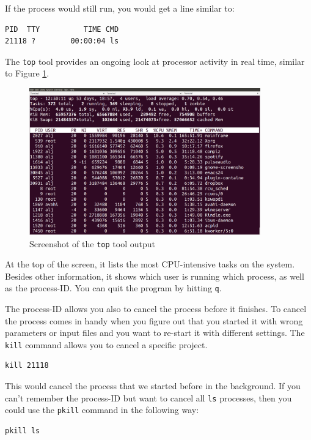 \documentclass[11pt]{article}
\begin{document}
If the process would still run, you would
get a line similar to:

\begin{verbatim}
PID  TTY          TIME CMD
21118 ?        00:00:04 ls
\end{verbatim}

The \texttt{top} tool provides an ongoing look at processor activity in real
time, similar to Figure \ref{fig:top}.


\begin{figure}[htb]
\centering
\includegraphics[width=10cm]{top.png}
\caption{\label{fig:top}Screenshot of the \texttt{top} tool output}
\end{figure}

At the top of the screen, it lists the most CPU-intensive tasks on the
system. Besides other information, it shows which user is running
which process, as well as the process-ID. You can quit the program by
hitting \texttt{q}.

The process-ID allows you also to cancel the process before it
finishes. To cancel the process comes in handy when you figure out
that you started it with wrong parameters or input files and you want
to re-start it with different settings. The \texttt{kill} command allows you
to cancel a specific project.

\begin{verbatim}
kill 21118
\end{verbatim}

This would cancel the process that we started before in the
background. If you can't remember the process-ID but want to cancel
all \texttt{ls} processes, then you could use the \texttt{pkill} command in the
following way:

\begin{verbatim}
pkill ls
\end{verbatim}
\end{document}
